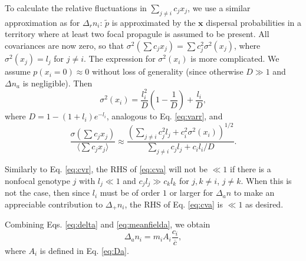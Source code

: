\documentclass[11pt]{article}
\begin{document}
To calculate the relative fluctuations in $\sum_{j\neq i} c_j x_j$, we use a similar approximation as for $\Delta_r n_i$: $\tilde{p}$ is approximated by the ${\mathbf x}$ dispersal probabilities in a territory where at least two focal propagule is assumed to be present. All covariances are now zero, so that $\sigma^2(\sum c_j x_j)=\sum c_j^2 \sigma^2(x_j)$, where $\sigma^2(x_j)=l_j$ for $j\neq i$. The expression for $\sigma^2(x_i)$ is more complicated. We assume $p(x_i=0)\approx 0$ without loss of generality (since otherwise $D\gg 1$ and $\Delta n_a$ is negligible). Then
\begin{equation}
\sigma^2(x_i)=\frac{l_i^2}{D}\left(1-\frac{1}{D}\right)+\frac{l_i}{D},
\end{equation}
where $D=1-(1+l_i)e^{-l_i}$, analogous to Eq. \eqref{eq:varr}, and 
\begin{equation}
\frac{\sigma(\sum c_j x_j)}{\langle\sum c_j x_j\rangle} \approx\frac{\left(\sum_{j\neq i} c_j^2 l_j + c_i^2 \sigma^2(x_i)\right)^{1/2}}{\sum_{j\neq i} c_j l_j + c_i l_i/D} \label{eq:cva}.
\end{equation}

Similarly to Eq. \eqref{eq:cvr}, the RHS of \eqref{eq:cva} will not be $\ll1$ if there is a nonfocal genotype $j$ with $l_j\ll 1$ and $c_j l_j\gg c_k l_k$ for $j,k\neq i$, $j\neq k$. When this is not the case, then since $l_i$ must be of order $1$ or larger for $\Delta_a n$ to make an appreciable contribution to $\Delta_+ n_i$, the RHS of Eq. \eqref{eq:cva} is $\ll 1$ as desired. 

Combining Eqs. \eqref{eq:delta} and \eqref{eq:meanfielda}, we obtain
\begin{equation}
\Delta_a n_i=m_i A_i \frac{c_i}{\overline{c}},
\end{equation}
where $A_i$ is defined in Eq. \eqref{eq:Da}.

%
%
\end{document}

